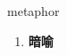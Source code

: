 
\begin{frame}
{\huge metaphor}
\begin{center}
\begin{enumerate}\Large
  \item \textbf{暗喻}
\end{enumerate}
\end{center}
\end{frame}
